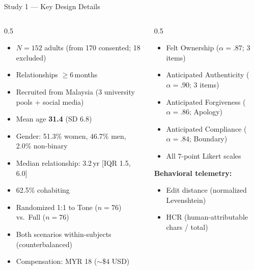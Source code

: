 \documentclass[10pt,aspectratio=169]{beamer}
\begin{document}
\begin{frame}{Study 1 --- Key Design Details}
\begin{columns}[T]
\scriptsize
\begin{column}{0.5\textwidth}
  \begin{keybox}
    \begin{itemize}\setlength\itemsep{1pt}
      \item $N{=}152$ adults (from 170 consented; 18 excluded)
      \item Relationships $\geq$6\,months
      \item Recruited from Malaysia (3 university pools + social media)
      \item Mean age \textbf{31.4} (SD 6.8)
      \item Gender: 51.3\% women, 46.7\% men, 2.0\% non-binary
      \item Median relationship: 3.2\,yr [IQR 1.5, 6.0]
      \item 62.5\% cohabiting
      \item Randomized 1:1 to Tone ($n{=}76$) vs.\ Full ($n{=}76$)
      \item Both scenarios within-subjects (counterbalanced)
      \item Compensation: MYR 18 ($\sim$\$4 USD)
    \end{itemize}
  \end{keybox}
\end{column}
\begin{column}{0.5\textwidth}
  \begin{keybox}
    \begin{itemize}\setlength\itemsep{1pt}
      \item Felt Ownership ($\alpha{=}.87$; 3 items)
      \item Anticipated Authenticity ($\alpha{=}.90$; 3 items)
      \item Anticipated Forgiveness ($\alpha{=}.86$; Apology)
      \item Anticipated Compliance ($\alpha{=}.84$; Boundary)
      \item All 7-point Likert scales
    \end{itemize}
    \vspace{1pt}
    \textbf{Behavioral telemetry:}
    \begin{itemize}\setlength\itemsep{1pt}
      \item Edit distance (normalized Levenshtein)
      \item HCR (human-attributable chars / total)

\end{itemize}
\end{keybox}
\end{column}
\end{columns}
\end{frame}
\end{document}
